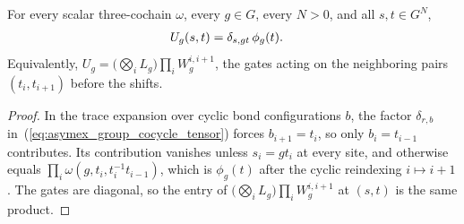 \begin{lemma}
    \label{thm:asymex_group_cocycle_kernel}
    \leanok
    For every scalar three-cochain $\omega$, every $g\in G$, every $N>0$,
    and all $s,t\in G^N$,
    \begin{align}
        U_g(s,t) & =\delta_{s,gt}\,\phi_g(t).
        \notag
    \end{align}
    Equivalently,
    $U_g=\bigl(\bigotimes_iL_g\bigr)\prod_iW_g^{i,i+1}$, the gates acting on
    the neighboring pairs $(t_i,t_{i+1})$ before the shifts.
\end{lemma}

\begin{proof}
    \leanok
    In the trace expansion over cyclic bond configurations $b$, the factor
    $\delta_{r,b}$ in~(\ref{eq:asymex_group_cocycle_tensor}) forces
    $b_{i+1}=t_i$, so only $b_i=t_{i-1}$ contributes. Its contribution
    vanishes unless $s_i=gt_i$ at every site, and otherwise equals
    $\prod_i\omega(g,t_i,t_i^{-1}t_{i-1})$, which is $\phi_g(t)$ after the
    cyclic reindexing $i\mapsto i+1$. The gates are diagonal, so the entry
    of $\bigl(\bigotimes_iL_g\bigr)\prod_iW_g^{i,i+1}$ at $(s,t)$ is the
    same product.
\end{proof}

